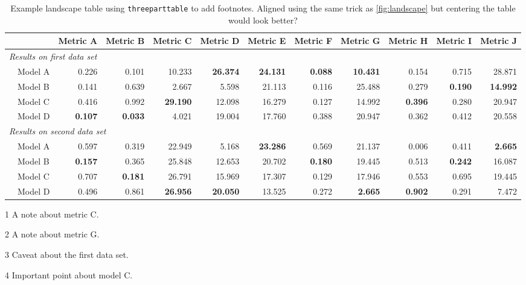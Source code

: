 \begin{sidewaystable}
  \centering
  \begin{threeparttable}
    \begin{tabular}{l l r r r r r r r r r r}
    \toprule
    & & Metric A & Metric B & Metric C\tnote{1} & Metric D & Metric E & Metric F & Metric G\tnote{2} & Metric H & Metric I & Metric J\\
    \midrule
    \multicolumn{12}{l}{\textit{Results on first data set\tnote{3}}}\\
    & Model A & 0.226 & 0.101 & 10.233 & \textbf{26.374} & \textbf{24.131} & \textbf{0.088} & \textbf{10.431} & 0.154 & 0.715 & 28.871\\
    & Model B & 0.141 & 0.639 & 2.667 & 5.598 & 21.113 & 0.116 & 25.488 & 0.279 & \textbf{0.190} & \textbf{14.992}\\
    & Model C\tnote{4} & 0.416 & 0.992 & \textbf{29.190} & 12.098 & 16.279 & 0.127 & 14.992 & \textbf{0.396} & 0.280 & 20.947\\
    & Model D & \textbf{0.107} & \textbf{0.033} & 4.021 & 19.004 & 17.760 & 0.388 & 20.947 & 0.362 & 0.412 & 20.558\\
    \multicolumn{12}{l}{\textit{Results on second data set}}\\
    & Model A & 0.597 & 0.319 & 22.949 & 5.168 & \textbf{23.286} & 0.569 & 21.137 & 0.006 & 0.411 & \textbf{2.665}\\
    & Model B & \textbf{0.157} & 0.365 & 25.848 & 12.653 & 20.702 & \textbf{0.180} & 19.445 & 0.513 & \textbf{0.242} & 16.087\\
    & Model C\tnote{4} & 0.707 & \textbf{0.181} & 26.791 & 15.969 & 17.307 & 0.129 & 17.946 & 0.553 & 0.695 & 19.445\\
    & Model D & 0.496 & 0.861 & \textbf{26.956} & \textbf{20.050} & 13.525 & 0.272 & \textbf{2.665} & \textbf{0.902} & 0.291 & 7.472\\
    \bottomrule
    \end{tabular}
  \begin{tablenotes}
    \item[1] A note about metric C.
    \item[2] A note about metric G.
    \item[3] Caveat about the first data set.
    \item[4] Important point about model C.
  \end{tablenotes}
  \end{threeparttable}
  \caption{Example landscape table using \texttt{threeparttable} to add footnotes. Aligned
  using the same trick as \cref{fig:landscape} but centering the table would look better?}
  \label{tbl:landscape}
  \vspace{51mm}\hspace{0pt}
\end{sidewaystable}

